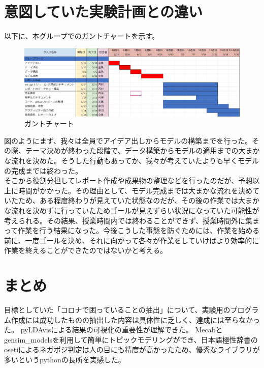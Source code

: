 \documentclass[a4paper, 11pt, titlepage]{jsarticle}
\begin{document}
\section{意図していた実験計画との違い}
以下に、本グループでのガントチャートを示す。\\
\begin{figure}[H]
  \centering
  \includegraphics[scale=0.45]{gantotya-to.png}
  \caption{ガントチャート}
\end{figure}
図のようにまず、我々は全員でアイデア出しからモデルの構築までを行った。その際、テーマ決めが終わった段階で、データ構築からモデルの適用までの大まかな流れを決めた。そうした行動もあってか、我々が考えていたよりも早くモデルの完成までは終わった。\\
そこから役割分担してレポート作成や成果物の整理などを行ったのだが、予想以上に時間がかかった。その理由として、モデル完成までは大まかな流れを決めていたため、ある程度終わりが見えていた状態なのだが、その後の作業では大まかな流れを決めずに行っていたためゴールが見えずらい状況になっていた可能性が考えられる。その結果、授業時間内では終わることができず、授業時間外に集まって作業を行う結果になった。今後こうした事態を防ぐためには、作業を始める前に、一度ゴールを決め、それに向かって各々が作業をしていけばより効率的に作業を終えることができたのではないかと考える。

\section{まとめ}
目標としていた「コロナで困っていることの抽出」について、実験用のプログラム作成には成功したものの抽出した内容は具体性に乏しく、達成には至らなかった。
pyLDAvisによる結果の可視化の重要性が理解できた。
Mecabとgensim\_modelsを利用して簡単にトピックモデリングができ、日本語極性辞書のosetiによるネガポジ判定は人の目にも精度が高かったため、優秀なライブラリが多いというpythonの長所を実感した。
\end{document}
